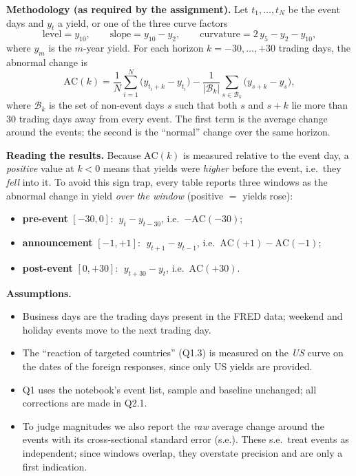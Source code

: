 \documentclass[11pt]{article}
\begin{document}
\textbf{Methodology (as required by the assignment).} Let $t_1,\dots,t_N$ be
the event days and $y_t$ a yield, or one of the three curve factors
\[
\text{level}=y_{10},\qquad
\text{slope}=y_{10}-y_{2},\qquad
\text{curvature}=2\,y_{5}-y_{2}-y_{10},
\]
where $y_m$ is the $m$-year yield. For each horizon $k=-30,\dots,+30$ trading
days, the abnormal change is
\[
\mathrm{AC}(k)
=\frac{1}{N}\sum_{i=1}^{N}\bigl(y_{t_i+k}-y_{t_i}\bigr)
-\frac{1}{|\mathcal{B}_k|}\sum_{s\in\mathcal{B}_k}\bigl(y_{s+k}-y_{s}\bigr),
\]
where $\mathcal{B}_k$ is the set of non-event days $s$ such that both $s$ and
$s+k$ lie more than 30 trading days away from every event. The first term is
the average change around the events; the second is the ``normal'' change
over the same horizon.

\textbf{Reading the results.} Because $\mathrm{AC}(k)$ is measured relative
to the event day, a \emph{positive} value at $k<0$ means that yields were
\emph{higher} before the event, i.e.\ they \emph{fell} into it. To avoid this
sign trap, every table reports three windows as the abnormal change in yield
\emph{over the window} (positive $=$ yields rose):
\begin{itemize}[leftmargin=1.2em,nosep]
\item \textbf{pre-event} $[-30,0]$: $\;y_{t}-y_{t-30}$, i.e.\ $-\mathrm{AC}(-30)$;
\item \textbf{announcement} $[-1,+1]$: $\;y_{t+1}-y_{t-1}$, i.e.\ $\mathrm{AC}(+1)-\mathrm{AC}(-1)$;
\item \textbf{post-event} $[0,+30]$: $\;y_{t+30}-y_{t}$, i.e.\ $\mathrm{AC}(+30)$.
\end{itemize}

\textbf{Assumptions.}
\begin{itemize}[leftmargin=1.2em,nosep]
\item[(A1)] Business days are the trading days present in the FRED data;
weekend and holiday events move to the next trading day.
\item[(A2)] The ``reaction of targeted countries'' (Q1.3) is measured on the
\emph{US} curve on the dates of the foreign responses, since only US yields
are provided.
\item[(A3)] Q1 uses the notebook's event list, sample and baseline unchanged;
all corrections are made in Q2.1.
\item[(A4)] To judge magnitudes we also report the \emph{raw} average change
around the events with its cross-sectional standard error (s.e.). These
s.e.\ treat events as independent; since windows overlap, they overstate
precision and are only a first indication.
\end{itemize}
\end{document}
